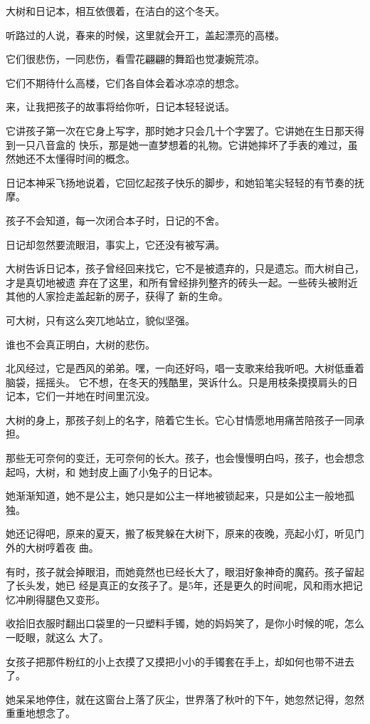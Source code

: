 \documentclass[12pt,a4paper]{article}
\begin{document}
		大树和日记本，相互依偎着，在洁白的这个冬天。

		听路过的人说，春来的时候，这里就会开工，盖起漂亮的高楼。


		它们很悲伤，一同悲伤，看雪花翩翩的舞蹈也觉凄婉荒凉。

		它们不期待什么高楼，它们各自体会着冰凉凉的想念。


		来，让我把孩子的故事将给你听，日记本轻轻说话。

		它讲孩子第一次在它身上写字，那时她才只会几十个字罢了。它讲她在生日那天得到一只八音盒的
	快乐，那是她一直梦想着的礼物。它讲她摔坏了手表的难过，虽然她还不太懂得时间的概念。

		日记本神采飞扬地说着，它回忆起孩子快乐的脚步，和她铅笔尖轻轻的有节奏的抚摩。

		孩子不会知道，每一次闭合本子时，日记的不舍。

		日记却忽然要流眼泪，事实上，它还没有被写满。

		大树告诉日记本，孩子曾经回来找它，它不是被遗弃的，只是遗忘。而大树自己，才是真切地被遗
	弃在了这里，和所有曾经排列整齐的砖头一起。一些砖头被附近其他的人家捡走盖起新的房子，获得了
	新的生命。

		可大树，只有这么突兀地站立，貌似坚强。

		谁也不会真正明白，大树的悲伤。


		北风经过，它是西风的弟弟。嘿，一向还好吗，唱一支歌来给我听吧。大树低垂着脑袋，摇摇头。
	它不想，在冬天的残酷里，哭诉什么。只是用枝条摸摸肩头的日记本，它们一并地在时间里沉没。

		大树的身上，那孩子刻上的名字，陪着它生长。它心甘情愿地用痛苦陪孩子一同承担。

		那些无可奈何的变迁，无可奈何的长大。孩子，也会慢慢明白吗，孩子，也会想念起吗，大树，和
	她封皮上画了小兔子的日记本。


		她渐渐知道，她不是公主，她只是如公主一样地被锁起来，只是如公主一般地孤独。

		她还记得吧，原来的夏天，搬了板凳躲在大树下，原来的夜晚，亮起小灯，听见门外的大树哼着夜
	曲。

		有时，孩子就会掉眼泪，而她竟然也已经长大了，眼泪好象神奇的魔药。孩子留起了长头发，她已
	经是真正的女孩子了。是5年，还是更久的时间呢，风和雨水把记忆冲刷得腿色又变形。

		收拾旧衣服时翻出口袋里的一只塑料手镯，她的妈妈笑了，是你小时候的呢，怎么一眨眼，就这么
	大了。

		女孩子把那件粉红的小上衣摸了又摸把小小的手镯套在手上，却如何也带不进去了。

		她呆呆地停住，就在这窗台上落了灰尘，世界落了秋叶的下午，她忽然记得，忽然重重地想念了。
\end{document}
